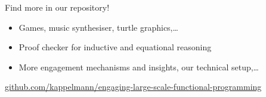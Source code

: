 \documentclass[aspectratio=169]{beamer}
\begin{document}




\begin{frame}
\centerline{\alert{\huge{Find more in our repository!}}}
\begin{itemize}
\item Games, music synthesiser, turtle graphics,\dots
\item Proof checker for inductive and equational reasoning
\item More engagement mechanisms and insights, our technical setup,\dots
\end{itemize}

\vspace{\baselineskip}
\centerline{\small\url{github.com/kappelmann/engaging-large-scale-functional-programming}}
\end{frame}
\end{document}
